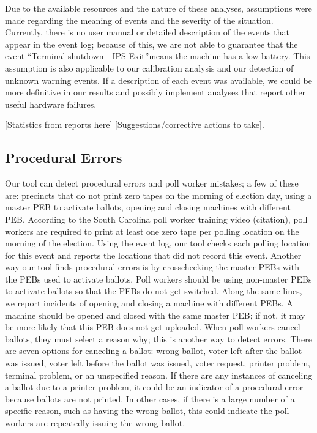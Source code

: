 Due to the available resources and the nature of these analyses, assumptions were made regarding the meaning of events and the severity of the situation.  Currently, there is no user manual or detailed description of the events that appear in the event log; because of this, we are not able to guarantee that the event \textquotedblleft Terminal shutdown - IPS Exit\textquotedblright means the machine has a low battery.  This assumption is also applicable to our calibration analysis and our detection of unknown warning events.  If a description of each event was available, we could be more definitive in our results and possibly implement analyses that report other useful hardware failures.    

[Statistics from reports here] [Suggestions/corrective actions to take].

\subsection{Procedural Errors}
Our tool can detect procedural errors and poll worker mistakes; a few of these are: precincts that do not print zero tapes on the morning of election day, using a master PEB to activate ballots, opening and closing machines with different PEB.  According to the South Carolina poll worker training video (citation), poll workers are required to print at least one zero tape per polling location on the morning of the election.  Using the event log, our tool checks each polling location for this event and reports the locations that did not record this event.  Another way our tool finds procedural errors is by crosschecking the master PEBs with the PEBs used to activate ballots.  Poll workers should be using non-master PEBs to activate ballots so that the PEBs do not get switched.  Along the same lines, we report incidents of opening and closing a machine with different PEBs.  A machine should be opened and closed with the same master PEB; if not, it may be more likely that this PEB does not get uploaded.   When poll workers cancel ballots, they must select a reason why; this is another way to detect errors.  There are seven options for canceling a ballot: wrong ballot, voter left after the ballot was issued, voter left before the ballot was issued, voter request, printer problem, terminal problem, or an unspecified reason.  If there are any instances of canceling a ballot due to a printer problem, it could be an indicator of a procedural error because ballots are not printed.  In other cases, if there is a large number of a specific reason, such as having the wrong ballot, this could indicate the poll workers are repeatedly issuing the wrong ballot.  

